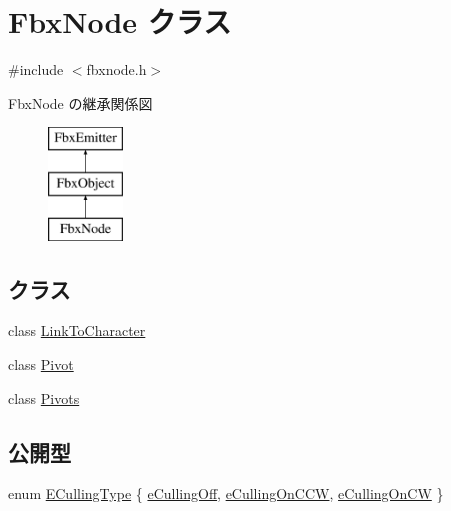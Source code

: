 \hypertarget{class_fbx_node}{}\section{Fbx\+Node クラス}
\label{class_fbx_node}


{\ttfamily \#include $<$fbxnode.\+h$>$}

Fbx\+Node の継承関係図\begin{figure}[H]
\begin{center}
\leavevmode
\includegraphics[height=3.000000cm]{class_fbx_node}
\end{center}
\end{figure}
\subsection*{クラス}
\begin{DoxyCompactItemize}
\item 
class \hyperlink{class_fbx_node_1_1_link_to_character}{Link\+To\+Character}
\item 
class \hyperlink{class_fbx_node_1_1_pivot}{Pivot}
\item 
class \hyperlink{class_fbx_node_1_1_pivots}{Pivots}
\end{DoxyCompactItemize}
\subsection*{公開型}
\begin{DoxyCompactItemize}
\item 
enum \hyperlink{class_fbx_node_afdb6d2c1708802d8b175f5094ff06046}{E\+Culling\+Type} \{ \hyperlink{class_fbx_node_afdb6d2c1708802d8b175f5094ff06046ad1b15be3d6e4389cae55274dd6c9252c}{e\+Culling\+Off}, 
\hyperlink{class_fbx_node_afdb6d2c1708802d8b175f5094ff06046ad305d6e9b21ce08664513b6a7a1dc1c6}{e\+Culling\+On\+C\+CW}, 
\hyperlink{class_fbx_node_afdb6d2c1708802d8b175f5094ff06046a2642748f83675b7421e4488f13cc5af7}{e\+Culling\+On\+CW}
 \}
\end{DoxyCompactItemize}
